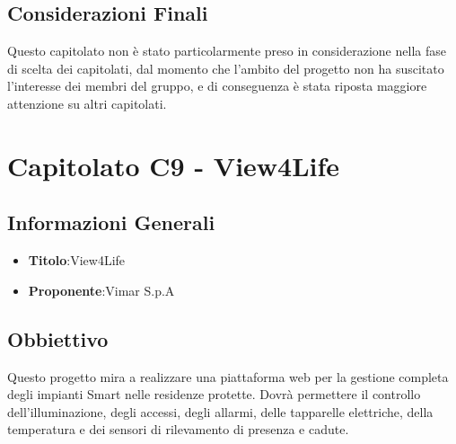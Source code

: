 \documentclass[a4paper,12pt]{article}
\begin{document}
    \subsection{Considerazioni Finali}
    Questo capitolato non è stato particolarmente preso in considerazione nella fase di scelta dei capitolati, dal momento che l’ambito del progetto non ha suscitato l’interesse dei membri del gruppo, e di conseguenza è stata riposta maggiore attenzione su altri capitolati.


    \section{Capitolato C9 - View4Life}
    \subsection{Informazioni Generali}
        \begin{itemize}
            \item \textbf{Titolo}:View4Life
            \item \textbf{Proponente}:Vimar S.p.A
        \end{itemize}
    \subsection{Obbiettivo}
    Questo progetto mira a realizzare una piattaforma web per la gestione completa degli impianti Smart nelle residenze protette. Dovrà permettere il controllo dell’illuminazione, degli accessi, degli allarmi, delle tapparelle elettriche, della temperatura e dei sensori di rilevamento di presenza e cadute.
\end{document}
